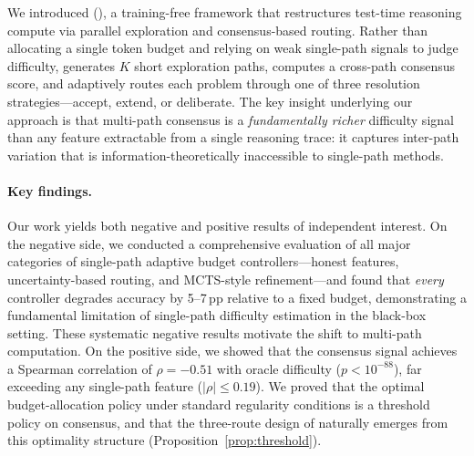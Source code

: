 
We introduced \textbf{\fullmethod{}} (\method{}), a training-free framework that restructures test-time reasoning compute via parallel exploration and consensus-based routing.
Rather than allocating a single token budget and relying on weak single-path signals to judge difficulty, \method{} generates $K$ short exploration paths, computes a cross-path consensus score, and adaptively routes each problem through one of three resolution strategies---accept, extend, or deliberate.
The key insight underlying our approach is that multi-path consensus is a \emph{fundamentally richer} difficulty signal than any feature extractable from a single reasoning trace: it captures inter-path variation that is information-theoretically inaccessible to single-path methods.

\paragraph{Key findings.}
Our work yields both negative and positive results of independent interest.
On the negative side, we conducted a comprehensive evaluation of all major categories of single-path adaptive budget controllers---honest features, uncertainty-based routing, and MCTS-style refinement---and found that \emph{every} controller degrades accuracy by 5--7\,pp relative to a fixed budget, demonstrating a fundamental limitation of single-path difficulty estimation in the black-box setting.
These systematic negative results motivate the shift to multi-path computation.
On the positive side, we showed that the consensus signal achieves a Spearman correlation of $\rho = -0.51$ with oracle difficulty ($p < 10^{-88}$), far exceeding any single-path feature ($|\rho| \le 0.19$).
We proved that the optimal budget-allocation policy under standard regularity conditions is a threshold policy on consensus, and that the three-route design of \method{} naturally emerges from this optimality structure (Proposition~\ref{prop:threshold}).

